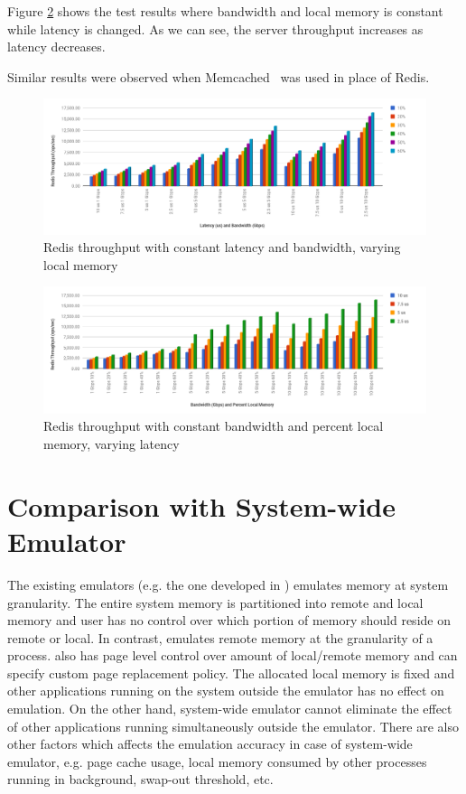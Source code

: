 Figure \ref{fig:vary_config_latency} shows the test results where bandwidth and local memory is constant while latency is changed. As we can see, the server throughput increases as latency decreases.

Similar results were observed when Memcached~\cite{memcached} was used in place of Redis.

\begin{figure}[t]
	\centering
	\includegraphics[width=\linewidth]{evaluation/vary_config_throughput_local_mem.png}
	\caption{Redis throughput with constant latency and bandwidth, varying local memory}
	\label{fig:vary_config_localmem}
\end{figure}

\begin{figure}[t]
	\centering
	\includegraphics[width=\linewidth]{evaluation/vary_config_throughput_latency.png}
	\caption{Redis throughput with constant bandwidth and percent local memory, varying latency}
	\label{fig:vary_config_latency}
\end{figure}

\section{Comparison with System-wide Emulator}
The existing emulators (e.g. the one developed in \cite{Gao}) emulates memory at system granularity. The entire system memory is partitioned into remote and local memory and user has no control over which portion of memory should reside on remote or local. In contrast, {\dime} emulates remote memory at the granularity of a process. {\dime} also has page level control over amount of local/remote memory and can specify custom page replacement policy. The allocated local memory is fixed and other applications running on the system outside the emulator has no effect on emulation. On the other hand, system-wide emulator cannot eliminate the effect of other applications running simultaneously outside the emulator. There are also other factors which affects the emulation accuracy in case of system-wide emulator, e.g. page cache usage, local memory consumed by other processes running in background, swap-out threshold, etc.

